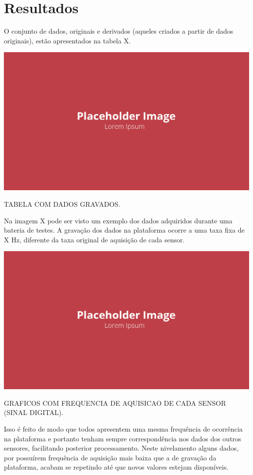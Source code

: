 \chapter{Resultados}\label{chp:res}

O conjunto de dados, originais e derivados (aqueles criados a partir de dados originais), estão apresentados na tabela X.

\begin{table}[!ht]
    \centering
    \includegraphics[width=.8\linewidth]{figuras/outras/placeholder.png}
    \caption{TABELA COM DADOS GRAVADOS\cite{autor}.}
    \label{fig:placeholder}
\end{table}

Na imagem X pode ser visto um exemplo dos dados adquiridos durante uma bateria de testes. A gravação dos dados na plataforma ocorre a uma taxa fixa de X Hz, diferente da taxa original de aquisição de cada sensor. 

\begin{table}[!ht]
    \centering
    \includegraphics[width=.8\linewidth]{figuras/outras/placeholder.png}
    \caption{GRAFICOS COM FREQUENCIA DE AQUISICAO DE CADA SENSOR (SINAL DIGITAL)\cite{autor}.}
    \label{fig:placeholder}
\end{table}

Isso é feito de modo que todos apresentem uma mesma frequência de ocorrência na plataforma e portanto tenham sempre correspondência nos dados dos outros sensores, facilitando posterior processamento. Neste nivelamento alguns dados, por possuírem frequência de aquisição mais baixa que a de gravação da plataforma, acabam se repetindo até que novos valores estejam disponíveis.

